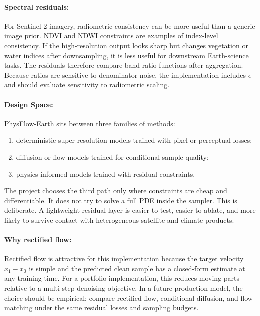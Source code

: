 \documentclass{article}
\begin{document}
\paragraph{Spectral residuals:}

For Sentinel-2 imagery, radiometric consistency can be more useful than a generic image prior. NDVI and NDWI constraints are examples of index-level consistency. If the high-resolution output looks sharp but changes vegetation or water indices after downsampling, it is less useful for downstream Earth-science tasks. The residuals therefore compare band-ratio functions after aggregation. Because ratios are sensitive to denominator noise, the implementation includes $\epsilon$ and should evaluate sensitivity to radiometric scaling.

\paragraph{Design Space:}

PhysFlow-Earth sits between three families of methods:
\begin{enumerate}
  \item deterministic super-resolution models trained with pixel or perceptual losses;
  \item diffusion or flow models trained for conditional sample quality;
  \item physics-informed models trained with residual constraints.
\end{enumerate}
The project chooses the third path only where constraints are cheap and differentiable. It does not try to solve a full PDE inside the sampler. This is deliberate. A lightweight residual layer is easier to test, easier to ablate, and more likely to survive contact with heterogeneous satellite and climate products.

\paragraph{Why rectified flow:}

Rectified flow is attractive for this implementation because the target velocity $x_1-x_0$ is simple and the predicted clean sample has a closed-form estimate at any training time. For a portfolio implementation, this reduces moving parts relative to a multi-step denoising objective. In a future production model, the choice should be empirical: compare rectified flow, conditional diffusion, and flow matching under the same residual losses and sampling budgets.
\end{document}
